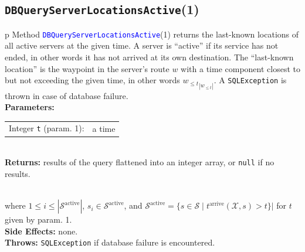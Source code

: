 \subsection{{\tt{}\protect{}DBQueryServerLocationsActive}(1)}
\begin{tabular}{p{\textwidth}}
\toprule
{}
Method \textcolor{blue}{{\tt{}\protect{}DBQueryServerLocationsActive}}(1) returns the
last-known locations of all active servers at the given time. A server is
``active'' if its service has not ended, in other words it has not arrived
at its own destination.
The ``last-known location'' is the waypoint in the server's route $w$
with a time component closest to but not exceeding the given time, in other
words ${w_{\leq t}}_{|w_{\leq t}|}$.
A {\tt{}SQLException} is thrown in case of database failure.\\
\midrule
\textbf{Parameters:} \\
\begin{tabular}{lp{116mm}}
Integer {\tt{}t} (param. 1):&a time
\end{tabular}\\
\textbf{Returns:} results of the query flattened into an integer array, or
{\tt{}null} if no results.

\\

where $1\leq i\leq |\mathcal{S}^\textrm{active}|$,
$s_i\in \mathcal{S}^\textrm{active}$, and
$\mathcal{S}^\textrm{active}= \{s\in\mathcal{S}\mid t^\textrm{arrive}(\mathcal{X},s)>t\}|$
for $t$ given by param. 1.\\
\textbf{Side Effects:} none.\\
\textbf{Throws:} {\tt{}SQLException} if database failure is encountered.\\
\bottomrule
\end{tabular}
\nwenddocs{}\endmoddef{}
